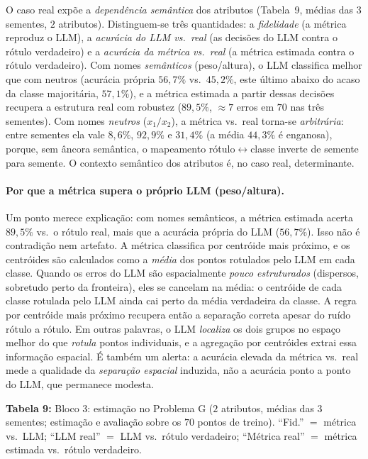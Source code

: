 \documentclass[12pt,a4paper]{article}
\begin{document}
O caso real expõe a \emph{dependência semântica} dos atributos
(Tabela~9, médias das $3$ sementes, $2$ atributos). Distinguem-se três
quantidades: a \emph{fidelidade} (a métrica reproduz o LLM), a \emph{acurácia do LLM vs.\
real} (as decisões do LLM contra o rótulo verdadeiro) e a \emph{acurácia da métrica vs.\
real} (a métrica estimada contra o rótulo verdadeiro). Com nomes \emph{semânticos}
(peso/altura), o LLM classifica melhor que com neutros (acurácia própria $56{,}7\%$ vs.\
$45{,}2\%$, este último abaixo do acaso da classe majoritária, $57{,}1\%$), e a métrica
estimada a partir dessas decisões recupera a estrutura real com robustez ($89{,}5\%$,
$\approx 7$ erros em $70$ nas três sementes). Com nomes \emph{neutros} ($x_1/x_2$), a métrica
vs.\ real torna-se \emph{arbitrária}: entre sementes ela vale $8{,}6\%$, $92{,}9\%$ e
$31{,}4\%$ (a média $44{,}3\%$ é enganosa), porque, sem âncora semântica, o mapeamento
rótulo$\leftrightarrow$classe inverte de semente para semente. O contexto semântico dos
atributos é, no caso real, determinante.

\paragraph{Por que a métrica supera o próprio LLM (peso/altura).}
Um ponto merece explicação: com nomes semânticos, a métrica estimada acerta $89{,}5\%$ vs.\
o rótulo real, mais que a acurácia própria do LLM ($56{,}7\%$). Isso não é contradição nem
artefato. A métrica classifica por centróide mais próximo, e os centróides são calculados
como a \emph{média} dos pontos rotulados pelo LLM em cada classe. Quando os erros do LLM são
espacialmente \emph{pouco estruturados} (dispersos, sobretudo perto da fronteira), eles se
cancelam na média: o centróide de cada classe rotulada pelo LLM ainda cai perto da média
verdadeira da classe. A regra por centróide mais próximo recupera então a separação correta
apesar do ruído rótulo a rótulo. Em outras palavras, o LLM \emph{localiza} os dois grupos no
espaço melhor do que \emph{rotula} pontos individuais, e a agregação por centróides extrai
essa informação espacial. É também um alerta: a acurácia elevada da métrica vs.\ real mede a
qualidade da \emph{separação espacial} induzida, não a acurácia ponto a ponto do LLM, que
permanece modesta.


\bigskip

\noindent \textbf{Tabela 9:} Bloco 3: estimação no Problema G ($2$ atributos, médias das $3$ sementes;
estimação e avaliação sobre os $70$ pontos de treino).
``Fid.'' $=$ métrica vs.\ LLM; ``LLM real'' $=$ LLM vs.\ rótulo verdadeiro; ``Métrica real''
$=$ métrica estimada vs.\ rótulo verdadeiro.
\end{document}
